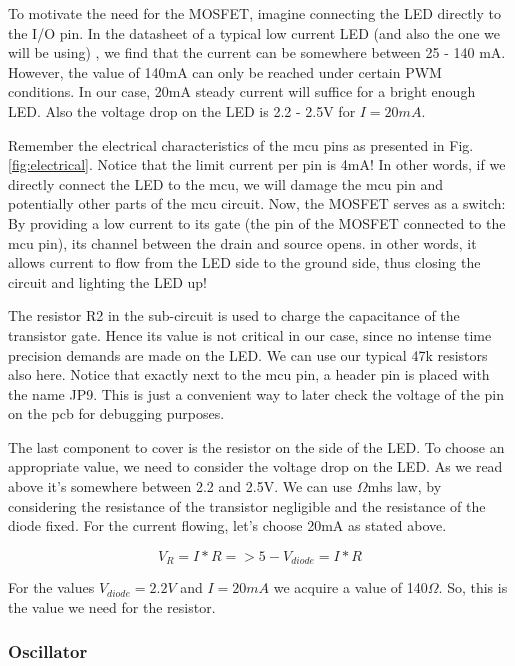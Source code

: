 To motivate the need for the MOSFET, imagine connecting the LED directly to the I/O pin. In the datasheet of a typical low current LED (and also the one we will be using) \cite{leds}, we find that the current can be somewhere between 25 - 140 mA. However, the value of 140mA can only be reached under certain PWM conditions. In our case, 20mA steady current will suffice for a bright enough LED. Also the voltage drop on the LED is 2.2 - 2.5V for $I = 20mA$.

Remember the electrical characteristics of the mcu pins as presented in Fig. \ref{fig:electrical}. Notice that the limit current per pin is 4mA! In other words, if we directly connect the LED to the mcu, we will damage the mcu pin and potentially other parts of the mcu circuit. 
Now, the MOSFET serves as a switch: By providing a low current to its gate (the pin of the MOSFET connected to the mcu pin), its channel between the drain and source opens. in other words, it allows current to flow from the LED side to the ground side, thus closing the circuit and lighting the LED up! 

The resistor R2 in the sub-circuit is used to charge the capacitance of the transistor gate. Hence its value is not critical in our case, since no intense time precision demands are made on the LED. We can use our typical 47k resistors also here. Notice that exactly next to the mcu pin, a header pin is placed with the name JP9. This is just a convenient way to later check the voltage of the pin on the pcb for debugging purposes.


The last component to cover is the resistor on the side of the LED. To choose an appropriate value, we need to consider the voltage drop on the LED. As we read above it's somewhere between 2.2 and 2.5V. We can use $\Omega$mhs law, by considering the resistance of the transistor negligible and the resistance of the diode fixed. For the current flowing, let's choose 20mA as stated above. 

$$V_R = I * R => 5 - V_{diode} = I * R$$

For the values $V_{diode} = 2.2V$ and $I = 20mA$ we acquire a value of 140$\Omega$. So, this is the value we need for the resistor.

\vspace{1cm}

\subsubsection{Oscillator}

